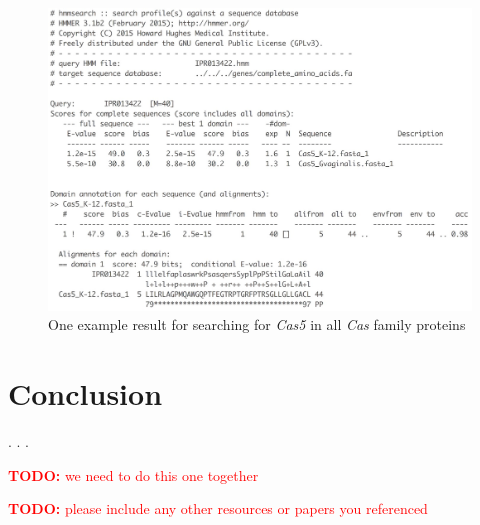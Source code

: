\documentclass[11pt, oneside]{article}
\newcommand{\TODO}[1]{\textcolor{red}{\textbf{TODO: } #1}}
\begin{document}
\begin{figure}[ht]
  \centering
  \includegraphics[scale = 0.3]{images/cas5Domain}
      \caption{One example result for searching for \textit{Cas5} in all \textit{Cas} family proteins}
      \label{Cas5}
\end{figure} 

\section{Conclusion}

.
.
.


\TODO{we need to do this one together}



\TODO{please include any other resources or papers you referenced}
\end{document}
